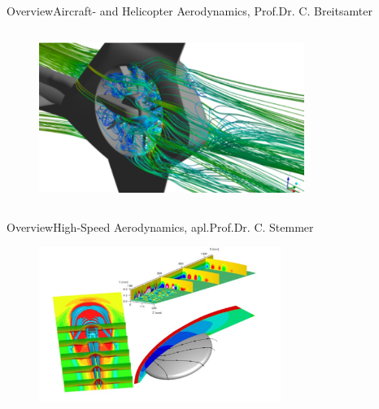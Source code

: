 \documentclass[AERbeamer%
              ,optEnglish%
              ,optBiber%
              ,optBibstyleAlphabetic%
              ,optBeamerClassicFormat%
              ]{AERlatex}%
\begin{document}
\begin{frame}[c]{Overview}{Aircraft- and Helicopter Aerodynamics, Prof.Dr. C. Breitsamter}
\begin{columns}[T]
\begin{column}{0.33\textwidth}
\begin{figure}
                \centering
                \includegraphics[width=0.77\textwidth]{Breitsamter9.png}
            \end{figure}
        \end{column}
    \end{columns}
\end{frame}


\begin{frame}[c]{Overview}{High-Speed Aerodynamics, apl.Prof.Dr. C. Stemmer}
    \centering
    \begin{figure}
        \centering
        \includegraphics[width=0.7\textwidth]{Stemmer.png}
    \end{figure}
\end{frame}
\end{document}
